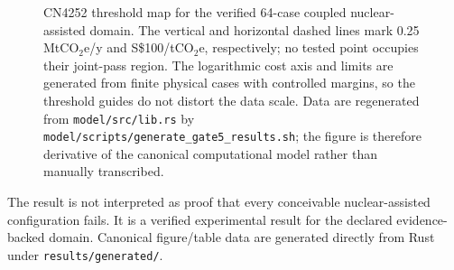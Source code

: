 \begin{figure}[htbp]
\centering
{}\thresholdbounds
{}\of{\thresholdbounds}\edef\plotxmin{\pgfplotsretval}
\of{\thresholdbounds}\edef\plotxmax{\pgfplotsretval}
\of{\thresholdbounds}\edef\plotymin{\pgfplotsretval}
\of{\thresholdbounds}\edef\plotymax{\pgfplotsretval}
\caption{CN4252 threshold map for the verified 64-case coupled nuclear-assisted domain. The vertical and horizontal dashed lines mark 0.25 MtCO$_2$e/y and S\$100/tCO$_2$e, respectively; no tested point occupies their joint-pass region. The logarithmic cost axis and limits are generated from finite physical cases with controlled margins, so the threshold guides do not distort the data scale. Data are regenerated from \texttt{model/src/lib.rs} by \texttt{model/scripts/generate\_gate5\_results.sh}; the figure is therefore derivative of the canonical computational model rather than manually transcribed.}
\label{fig:threshold-map}
\end{figure}

The result is not interpreted as proof that every conceivable nuclear-assisted configuration fails. It is a verified experimental result for the declared evidence-backed domain. Canonical figure/table data are generated directly from Rust under \texttt{results/generated/}.

